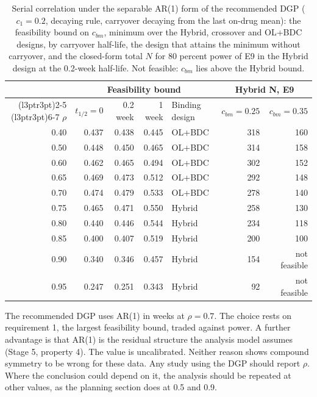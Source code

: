 \documentclass[
  11pt,
]{article}
\begin{document}
\begin{table}

\caption{\label{tab:rhobound}Serial correlation under the separable AR(1) form of the recommended DGP ($c_1 = 0.2$, decaying rule, carryover decaying from the last on-drug mean): the feasibility bound on $c_{bm}$, minimum over the Hybrid, crossover and OL+BDC designs, by carryover half-life, the design that attains the minimum without carryover, and the closed-form total $N$ for 80 percent power of E9 in the Hybrid design at the 0.2-week half-life. Not feasible: $c_{bm}$ lies above the Hybrid bound.}
\centering
\begin{tabular}[t]{rrrrlrr}
\toprule
\multicolumn{1}{c}{ } & \multicolumn{4}{c}{Feasibility bound} & \multicolumn{2}{c}{Hybrid N, E9} \\
\cmidrule(l{3pt}r{3pt}){2-5} \cmidrule(l{3pt}r{3pt}){6-7}
$\rho$ & $t_{1/2} = 0$ & 0.2 week & 1 week & Binding design & $c_{bm} = 0.25$ & $c_{bm} = 0.35$\\
\midrule
0.40 & 0.437 & 0.438 & 0.445 & OL+BDC & 318 & 160\\
0.50 & 0.448 & 0.450 & 0.465 & OL+BDC & 314 & 158\\
0.60 & 0.462 & 0.465 & 0.494 & OL+BDC & 302 & 152\\
0.65 & 0.469 & 0.473 & 0.512 & OL+BDC & 292 & 148\\
0.70 & 0.474 & 0.479 & 0.533 & OL+BDC & 278 & 140\\
0.75 & 0.465 & 0.471 & 0.550 & Hybrid & 258 & 130\\
0.80 & 0.440 & 0.446 & 0.544 & Hybrid & 234 & 118\\
0.85 & 0.400 & 0.407 & 0.519 & Hybrid & 200 & 100\\
0.90 & 0.340 & 0.346 & 0.457 & Hybrid & 154 & not feasible\\
0.95 & 0.247 & 0.251 & 0.343 & Hybrid & 92 & not feasible\\
\bottomrule
\end{tabular}
\end{table}

The recommended DGP uses AR(1) in weeks at \(\rho = 0.7\). The choice
rests on requirement 1, the largest feasibility bound, traded against
power. A further advantage is that AR(1) is the residual structure the
analysis model assumes (Stage 5, property 4). The value is
uncalibrated. Neither reason shows compound symmetry to be wrong for
these data. Any study using the DGP should report \(\rho\). Where the
conclusion could depend on it, the analysis should be repeated at
other values, as the planning section does at 0.5 and 0.9.
\end{document}
